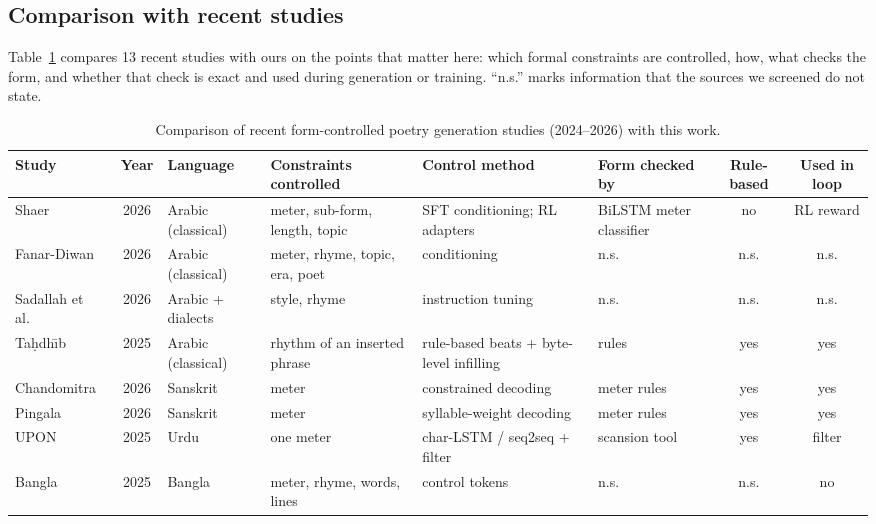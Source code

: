 \subsection{Comparison with recent studies}
Table~\ref{tab:lit-compare} compares 13 recent studies with ours on the points that matter here: which formal
constraints are controlled, how, what checks the form, and whether that check is exact and used during generation or
training. ``n.s.'' marks information that the sources we screened do not state.

\begin{table}[t]
\centering
\caption{Comparison of recent form-controlled poetry generation studies (2024--2026) with this work.}
\label{tab:lit-compare}
\footnotesize
\setlength{\tabcolsep}{4pt}
\begin{tabularx}{\textwidth}{@{}>{\raggedright\arraybackslash}p{2.3cm} c >{\raggedright\arraybackslash}p{1.9cm} >{\raggedright\arraybackslash}X >{\raggedright\arraybackslash}X >{\raggedright\arraybackslash}X c c@{}}
\toprule
Study & Year & Language & Constraints controlled & Control method & Form checked by & Rule-based & Used in loop \\
\midrule
Shaer~\cite{abbas2026shaer} & 2026 & Arabic (classical) & meter, sub-form, length, topic & SFT conditioning; RL adapters & BiLSTM meter classifier & no & RL reward \\
Fanar-Diwan~\cite{fanar2026fanar2} & 2026 & Arabic (classical) & meter, rhyme, topic, era, poet & conditioning & n.s. & n.s. & n.s. \\
Sadallah et al.~\cite{sadallah2026instructpoet} & 2026 & Arabic + dialects & style, rhyme & instruction tuning & n.s. & n.s. & n.s. \\
Ta\d{h}dh\={\i}b~\cite{elzohbi2025tahdib} & 2025 & Arabic (classical) & rhythm of an inserted phrase & rule-based beats + byte-level infilling & rules & yes & yes \\
Chandomitra~\cite{jagadeeshan2026chandomitra} & 2026 & Sanskrit & meter & constrained decoding & meter rules & yes & yes \\
Pingala~\cite{jagadeeshan2026pingala} & 2026 & Sanskrit & meter & syllable-weight decoding & meter rules & yes & yes \\
UPON~\cite{tabassam2025upon} & 2025 & Urdu & one meter & char-LSTM / seq2seq + filter & scansion tool & yes & filter \\
Bangla~\cite{amina2025bangla} & 2025 & Bangla & meter, rhyme, words, lines & control tokens & n.s. & n.s. & no \\

\end{tabularx}
\end{table}
